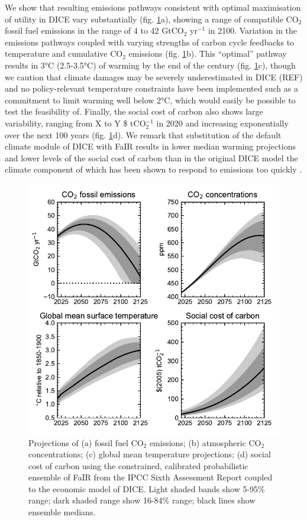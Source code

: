 \documentclass{article}
\begin{document}
We show that resulting emissions pathways consistent with optimal maximisation of utility in DICE vary substantially (fig. \ref{fig:projections}a), showing a range of compatible CO$_2$ fossil fuel emissions in the range of 4 to 42 GtCO$_2$ yr$^{-1}$ in 2100. Variation in the emissions pathways coupled with varying strengths of carbon cycle feedbacks to temperature and cumulative CO$_2$ emissions (fig. \ref{fig:projections}b). This ``optimal'' pathway results in 3°C (2.5-3.5°C) of warming by the end of the century (fig. \ref{fig:projections}c), though we caution that climate damages may be severely underestimated in DICE (REF) and no policy-relevant temperature constraints have been implemented such as a commitment to limit warming well below 2°C, which would easily be possible to test the feasibility of. Finally, the social cost of carbon also shows large variability, ranging from X to Y \$ tCO$_2^{-1}$ in 2020 and increasing exponentially over the next 100 years (fig. \ref{fig:projections}d). We remark that substitution of the default climate module of DICE with FaIR results in lower median warming projections and lower levels of the social cost of carbon than in the original DICE model \citep{Nordhaus2017} the climate component of which has been shown to respond to emissions too quickly \citep{Folini2021,Gasser2021}.

\begin{figure}[h]
\centering
\includegraphics[width=12cm]{../../figures/climate_projections.pdf}
\caption{Projections of (a) fossil fuel CO$_2$ emissions; (b) atmospheric CO$_2$ concentrations; (c) global mean temperature projections; (d) social cost of carbon using the constrained, calibrated probabilistic ensemble of FaIR from the IPCC Sixth Assessment Report coupled to the economic model of DICE. Light shaded bands show 5-95\% range; dark shaded range show 16-84\% range; black lines show ensemble medians.}
\label{fig:projections}
\end{figure}
\end{document}
